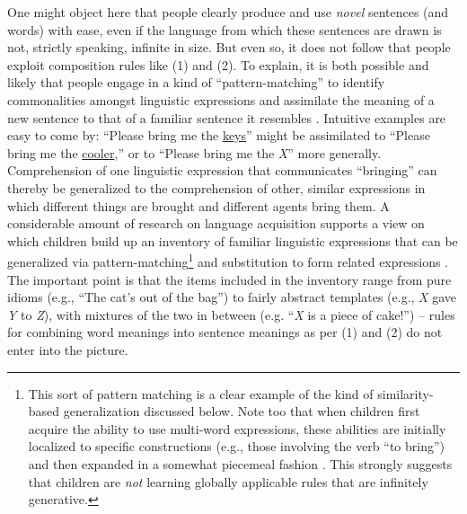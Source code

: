 One might object here that people clearly produce and use \textit{novel} sentences (and words) with ease, even if the language from which these sentences are drawn is not, strictly speaking, infinite in size. But even so, it does not follow that people exploit composition rules like (1) and (2). To explain, it is both possible and likely that people engage in a kind of ``pattern-matching'' to identify commonalities amongst linguistic expressions and assimilate the meaning of a new sentence to that of a familiar sentence it resembles \citep{Tomasello:2003}. Intuitive examples are easy to come by: ``Please bring me the \underline{keys}'' might be assimilated to ``Please bring me the \underline{cooler},'' or to ``Please bring me the \textit{X}'' more generally. Comprehension of one linguistic expression that communicates ``bringing'' can thereby be generalized to the comprehension of other, similar expressions in which different things are brought and different agents bring them. A considerable amount of research on language acquisition supports a view on which children build up an inventory of familiar linguistic expressions that can be generalized via pattern-matching\footnote{This sort of pattern matching is a clear example of the kind of similarity-based generalization discussed below. Note too that when children first acquire the ability to use multi-word expressions, these abilities are initially localized to specific constructions (e.g., those involving the verb ``to bring'') and then expanded in a somewhat piecemeal fashion \citep{Tomasello:2003,Tomasello:2005}. This strongly suggests that children are \textit{not} learning globally applicable rules that are infinitely generative.} and substitution to form related expressions \citep{Tomasello:2003}. The important point is that the items included in the inventory range from pure idioms (e.g., ``The cat's out of the bag'') to fairly abstract templates (e.g., \textit{X} gave \textit{Y} to \textit{Z}), with mixtures of the two in between (e.g. ``\textit{X} is a piece of cake!'') -- rules for combining word meanings into sentence meanings as per (1) and (2) do not enter into the picture. 

